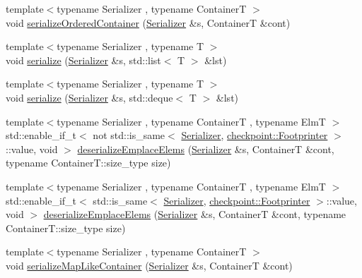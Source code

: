 \begin{DoxyCompactItemize}
\item 
{\footnotesize template$<$typename Serializer , typename ContainerT $>$ }\\void \hyperlink{namespacecheckpoint_a0b15edc50a881e06260e7112b2c60742}{serialize\+Ordered\+Container} (\hyperlink{structcheckpoint_1_1_serializer}{Serializer} \&s, ContainerT \&cont)
\item 
{\footnotesize template$<$typename Serializer , typename T $>$ }\\void \hyperlink{namespacecheckpoint_afb32627049eb840e4f8b9fd3022f2eb2}{serialize} (\hyperlink{structcheckpoint_1_1_serializer}{Serializer} \&s, std\+::list$<$ T $>$ \&lst)
\item 
{\footnotesize template$<$typename Serializer , typename T $>$ }\\void \hyperlink{namespacecheckpoint_a179b767294c9b23617f30fc4566d0be7}{serialize} (\hyperlink{structcheckpoint_1_1_serializer}{Serializer} \&s, std\+::deque$<$ T $>$ \&lst)
\item 
{\footnotesize template$<$typename Serializer , typename ContainerT , typename ElmT $>$ }\\std\+::enable\+\_\+if\+\_\+t$<$ not std\+::is\+\_\+same$<$ \hyperlink{structcheckpoint_1_1_serializer}{Serializer}, \hyperlink{structcheckpoint_1_1_footprinter}{checkpoint\+::\+Footprinter} $>$\+::value, void $>$ \hyperlink{namespacecheckpoint_a9016e0756f91e6e982b3c824c007c251}{deserialize\+Emplace\+Elems} (\hyperlink{structcheckpoint_1_1_serializer}{Serializer} \&s, ContainerT \&cont, typename Container\+T\+::size\+\_\+type size)
\item 
{\footnotesize template$<$typename Serializer , typename ContainerT , typename ElmT $>$ }\\std\+::enable\+\_\+if\+\_\+t$<$ std\+::is\+\_\+same$<$ \hyperlink{structcheckpoint_1_1_serializer}{Serializer}, \hyperlink{structcheckpoint_1_1_footprinter}{checkpoint\+::\+Footprinter} $>$\+::value, void $>$ \hyperlink{namespacecheckpoint_a811956d461a3ebc7329272fd33e1084f}{deserialize\+Emplace\+Elems} (\hyperlink{structcheckpoint_1_1_serializer}{Serializer} \&s, ContainerT \&cont, typename Container\+T\+::size\+\_\+type size)
\item 
{\footnotesize template$<$typename Serializer , typename ContainerT $>$ }\\void \hyperlink{namespacecheckpoint_a99092baac18b33d03b1bb47ed1f2d7fa}{serialize\+Map\+Like\+Container} (\hyperlink{structcheckpoint_1_1_serializer}{Serializer} \&s, ContainerT \&cont)
\item 

\end{DoxyCompactItemize}
